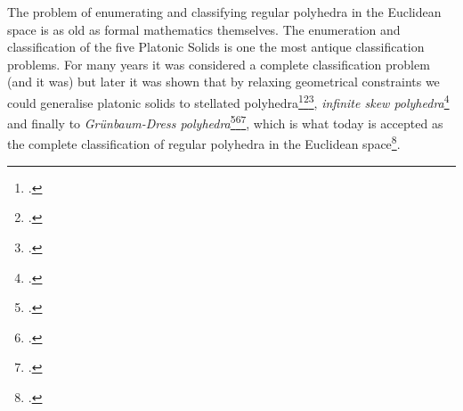The problem of enumerating and classifying regular polyhedra in the Euclidean space is as old as formal mathematics themselves. The enumeration and classification of the five Platonic Solids is one the most antique classification problems.
For many years it was considered a complete classification problem (and it was) but later it was shown that by relaxing geometrical constraints we could generalise platonic solids to stellated polyhedra\footcite{Kepler_1864_HarmoniaMundiOpera}\footcite{Poinsot_1810_MemoireSurLes}\footcite{Cauchy_1813_AlCauchyRecherche}, \emph{infinite skew polyhedra}\footcite{Coxeter_1937_RegularSkewPolyhedra} and finally to \emph{Grünbaum-Dress polyhedra}\footcite{Gruenbaum_1977_RegularPolyhedraOld}\footcite{Dress_1981_CombinatorialTheoryGrunbaums}\footcite{Dress_1985_CombinatorialTheoryGrunbaums}, which is what today is accepted as the complete classification of regular polyhedra in the Euclidean space\footcite{McMullenSchulte_1997_RegularPolytopesOrdinary}.

